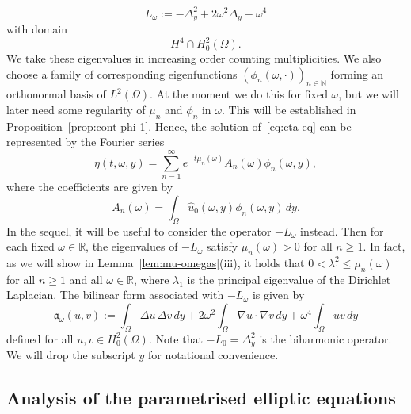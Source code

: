 \documentclass[a4paper, reqno,titlepage]{amsart}
\numberwithin{equation}{section}
\theoremstyle{plain}
\theoremstyle{definition}
\theoremstyle{remark}
\newcommand{\mfra}{\mathfrak{a}}
\newcommand{\NN}{\mathbb{N}}
\newcommand{\RR}{\mathbb{R}}
\begin{document}
\begin{equation}
  \label{eq:L-omega}
  L_\omega := -\Delta_y^2 +2 \omega^2 \Delta_y - \omega^4
\end{equation}
with domain
\begin{equation*}
  H^4 \cap H^2_0(\Omega).
\end{equation*}
We take these eigenvalues in increasing order counting multiplicities. We also choose a family of corresponding eigenfunctions $(\phi_n(\omega, \cdot))_{n \in \NN}$ forming an orthonormal basis of $L^2(\Omega)$. At the moment we do this for fixed $\omega$, but we will later need some regularity of $\mu_n$ and $\phi_n$ in $\omega$. This will be established in Proposition~\ref{prop:cont-phi-1}. Hence, the solution of~\eqref{eq:eta-eq} can be represented by the Fourier series
\begin{equation}
  \label{eq:eta-Fourier-series}
  \eta(t, \omega, y) = \sum_{n=1}^\infty e^{-t \mu_n(\omega)} A_n(\omega) \phi_n(\omega, y),
\end{equation}
where the coefficients are given by
\begin{equation}
  \label{eq:An}
  A_n(\omega) = \int_\Omega \widehat{u}_0(\omega,y) \phi_n(\omega, y) \,dy.
\end{equation}
In the sequel, it will be useful to consider the operator $-L_\omega$ instead. Then for each fixed $\omega \in \RR$, the eigenvalues of $-L_\omega$ satisfy $\mu_n(\omega) > 0$ for all $n \geq 1$. In fact, as we will show in Lemma~\ref{lem:mu-omegas}(iii), it holds that $0 < \lambda_1^2 \leq \mu_n(\omega)$ for all $n \ge 1$ and all $\omega \in \RR$, where $\lambda_1$ is the principal eigenvalue of the Dirichlet Laplacian. The bilinear form associated with $-L_\omega$ is given by
\begin{equation}
  \label{eq:a-omega}
  \mfra_\omega(u,v) := \int_\Omega \Delta u \, \Delta v \,dy + 2\omega^2 \int_\Omega \nabla u \cdot \nabla v \,dy + \omega^4 \int_\Omega uv \,dy
\end{equation}
defined for all $u, v \in H^2_0(\Omega)$. Note that $-L_0 = \Delta^2_y$ is the biharmonic operator. We will drop the subscript $y$ for notational convenience.

\subsection{Analysis of the parametrised elliptic equations}
\end{document}
